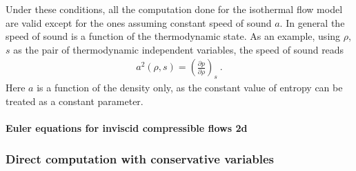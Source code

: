 \documentclass[letterpaper,10pt,english]{jupyterBook}
\begin{document}
\sphinxAtStartPar
{} 

\sphinxAtStartPar
Under these conditions, all the computation done for the isothermal flow model are valid except for the ones assuming constant speed of sound \(a\). In general the speed of sound is a function of the thermodynamic state. As an example, using \(\rho\), \(s\) as the pair of thermodynamic independent variables, the speed of sound reads
\begin{equation*}
\begin{split}a^2(\rho, s) = \left( \frac{\partial p}{\partial \rho} \right)_s \ .\end{split}
\end{equation*}
\sphinxAtStartPar
Here \(a\) is a function of the density only, as the constant value of entropy can be treated as a constant parameter.


\paragraph{Euler equations for inviscid compressible flows \sphinxhyphen{} 2d}
\label{\detokenize{ch/pde/characteristics:euler-equations-for-inviscid-compressible-flows-2d}}
\sphinxAtStartPar
{}
\subsubsection*{Direct computation with conservative variables}
\end{document}
